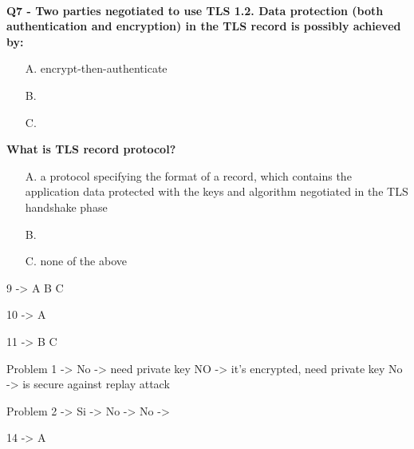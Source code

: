 \textbf{\\Q7 - Two parties negotiated to use TLS 1.2. Data protection (both authentication and encryption) in the TLS record is possibly achieved by:}
\begin{itemize}
    \item[A.] encrypt-then-authenticate
    \item[B.] 
    \item[C.] 
\end{itemize}

\textbf{What is TLS record protocol?}
\begin{itemize}
    \item[A.] a protocol specifying the format of a record, which contains the application data protected with the keys and algorithm negotiated in the TLS handshake phase
    \item[B.] 
    \item[C.] none of the above
\end{itemize}
\com{}

9 -> A B C 

10 -> A

11 -> B C

Problem 1 ->  {
    No -> need private key
    NO -> it's encrypted, need private key
    No -> is secure against replay attack
}

Problem 2 -> {
    Si -> 
    No -> 
    No -> 
}

14 -> A 